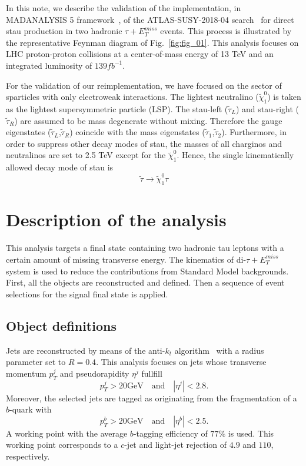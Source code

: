 \documentclass{ws-mpla}
\begin{document}
In this note, we describe the validation of the implementation, in MADANALYSIS 5 framework~\cite{Conte:2018vmg,Dumont:2014tja,Conte:2014zja,Conte:2012fm}, of the ATLAS-SUSY-2018-04 search~\cite{Aad:2019byo} for direct stau production in two hadronic $\tau +E^{miss}_T$ events. 
This process is illustrated by the representative Feynman diagram of Fig.~\ref{fig:fig_01}. 
This analysis focuses on LHC proton-proton collisions at a center-of-mass energy of 13 TeV and an integrated luminosity of $139 fb^{-1}$.

For the validation of our reimplementation, we have focused on the sector of sparticles with only electroweak interactions. 
The lightest neutralino ($\tilde{\chi}^0_1$) is taken as the lightest supersymmetric particle (LSP). 
The stau-left ($\tilde{\tau}_L$) and stau-right ($\tilde{\tau}_R$) are assumed to be mass degenerate without mixing.  Therefore the gauge eigenstates ($\tilde{\tau}_L$,$\tilde{\tau}_R$) coincide with the mass eigenstates ($\tilde{\tau}_1$,$\tilde{\tau}_2$). 
Furthermore, in order to suppress other decay modes of stau, the masses of all charginos and neutralinos are set to 2.5 TeV except for the $\tilde{\chi}^0_1$. 
Hence, the single kinematically allowed decay mode of stau is 
\begin{equation}
\tilde{\tau}\rightarrow\tilde{\chi}^0_1 \tau 
\end{equation}
 

\section{Description of the analysis}

This analysis targets a final state containing two hadronic tau leptons with a certain amount of missing transverse energy. 
The kinematics of di-$\tau +E^{miss}_T$ system is used to reduce the contributions from Standard Model backgrounds. 
First, all the objects are reconstructed and defined. Then a sequence of event selections for the signal final state is applied.

\subsection{Object definitions}

Jets are reconstructed by means of the anti-$k_t$ algorithm~\cite{Cacciari:2008gp} with a radius parameter set to $R=0.4$. This analysis focuses on jets whose transverse momentum $p^j_T$ and pseudorapidity $\eta^j$ fullfill
\begin{equation}
p^j_T > 20 \textrm{GeV}\quad \textrm{and}\quad |\eta^j| < 2.8.
\end{equation} 
Moreover, the selected jets are tagged as originating from the fragmentation of a $b$-quark with 
\begin{equation}
p^b_T > 20 \textrm{GeV}\quad \textrm{and}\quad |\eta^b| < 2.5.
\end{equation}
A working point with the average $b$-tagging efficiency of $77\%$ is used. This working point corresponds to a $c$-jet and light-jet rejection of $4.9$ and $110$, respectively.
\end{document}
